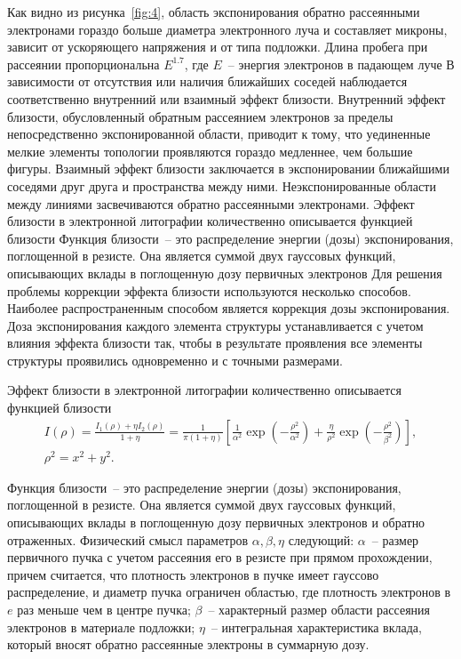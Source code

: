 Как видно из рисунка~\ref{fig:4}, область экспонирования обратно рассеянными электронами гораздо больше диаметра электронного луча и составляет микроны, зависит от ускоряющего напряжения и от типа подложки. Длина пробега при рассеянии пропорциональна $E^{1.7}$, где $E$~-- энергия электронов в падающем луче
В зависимости от отсутствия или наличия ближайших соседей наблюдается соответственно внутренний или взаимный эффект близости. Внутренний эффект близости, обусловленный обратным рассеянием электронов за
пределы непосредственно экспонированной области, приводит к тому, что уединенные мелкие элементы топологии проявляются гораздо медленнее, чем большие фигуры. Взаимный эффект близости заключается в экспонировании ближайшими соседями друг друга и пространства между ними. Неэкспонированные области между линиями засвечиваются обратно рассеянными электронами.
Эффект близости в электронной литографии количественно описывается функцией близости
Функция близости~-- это распределение энергии (дозы) экспонирования, поглощенной в резисте. Она является суммой двух гауссовых функций, описывающих вклады в поглощенную дозу первичных электронов
Для решения проблемы коррекции эффекта близости используются несколько способов. Наиболее распространенным способом является коррекция дозы экспонирования. Доза экспонирования каждого элемента структуры устанавливается с учетом влияния эффекта близости так, чтобы в результате проявления все элементы структуры проявились одновременно и с точными размерами.

Эффект близости в электронной литографии количественно описывается функцией близости
\begin{gather}
I(\rho)=\frac{I_1 (\rho)+ \eta I_2(\rho)}{1+\eta}=\frac{1}{\pi(1+\eta)}\left[\frac{1}{\alpha^2}\exp\left(-\frac{\rho^2}{\alpha^2}\right)+\frac{\eta}{\rho^2}\exp\left(-\frac{\rho^2}{\beta^2}\right)\right],\label{eq:A8}\\
\rho^2 = x^2 + y^2.\nonumber
\end{gather}

Функция близости~-- это распределение энергии (дозы) экспонирования, поглощенной в резисте. Она является суммой двух гауссовых функций, описывающих вклады в поглощенную дозу первичных электронов и обратно отраженных.
Физический смысл параметров $\alpha,\beta,\eta$ следующий: $\alpha$~-- размер первичного пучка с учетом рассеяния его в резисте при прямом прохождении, причем считается, что плотность электронов в пучке имеет гауссово распределение, и диаметр пучка ограничен областью, где плотность электронов в $e$ раз меньше чем в центре пучка; $\beta$~-- характерный размер области рассеяния электронов в материале подложки; $\eta$~-- интегральная характеристика вклада, который вносят обратно рассеянные электроны в суммарную дозу.

